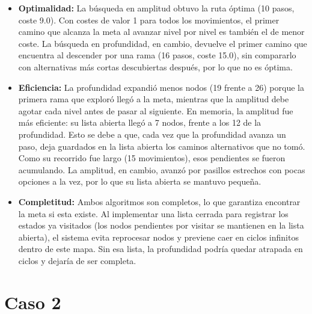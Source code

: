 \documentclass[12pt,a4paper]{article}
\begin{document}
\begin{itemize}
    \item \textbf{Optimalidad:} La búsqueda en amplitud obtuvo la ruta óptima (10 pasos, coste 9.0). Con costes de valor 1 para todos los movimientos, el primer camino que alcanza la meta al avanzar nivel por nivel es también el de menor coste. La búsqueda en profundidad, en cambio, devuelve el primer camino que encuentra al descender por una rama (16 pasos, coste 15.0), sin compararlo con alternativas más cortas descubiertas después, por lo que no es óptima.
    \item \textbf{Eficiencia:} La profundidad expandió menos nodos (19 frente a 26) porque la primera rama que exploró llegó a la meta, mientras que la amplitud debe agotar cada nivel antes de pasar al siguiente. En memoria, la amplitud fue más eficiente: su lista abierta llegó a 7 nodos, frente a los 12 de la profundidad. Esto se debe a que, cada vez que la profundidad avanza un paso, deja guardados en la lista abierta los caminos alternativos que no tomó. Como su recorrido fue largo (15 movimientos), esos pendientes se fueron acumulando. La amplitud, en cambio, avanzó por pasillos estrechos con pocas opciones a la vez, por lo que su lista abierta se mantuvo pequeña.
    \item \textbf{Completitud:} Ambos algoritmos son completos, lo que garantiza encontrar la meta si esta existe. Al implementar una lista cerrada para registrar los estados ya visitados (los nodos pendientes por visitar se mantienen en la lista abierta), el sistema evita reprocesar nodos y previene caer en ciclos infinitos dentro de este mapa. Sin esa lista, la profundidad podría quedar atrapada en ciclos y dejaría de ser completa.
\end{itemize}
\section{Caso 2}
\end{document}
